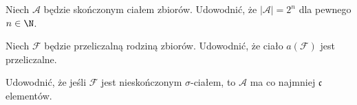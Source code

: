 \begin{problem}[10.1.9]
	Niech $\mathcal{A}$ będzie skończonym ciałem zbiorów. Udowodnić, że $\left| \mathcal{A} \right| = 2^{n}$ dla pewnego $n\in \N$.
\end{problem} 
\begin{problem}[10.1.10]
	Niech $\mathcal{F}$ będzie przeliczalną rodziną zbiorów. Udowodnić, że ciało $a\left( \mathcal{F} \right) $ jest przeliczalne.
\end{problem} 
\begin{problem}[10.1.11]
	Udowodnić, że jeśli $\mathcal{F}$ jest nieskończonym $\sigma $-ciałem, to $\mathcal{A}$ ma co najmniej $\mathfrak{c}$ elementów.
\end{problem} 
\begin{solution}
	
\end{solution} 
